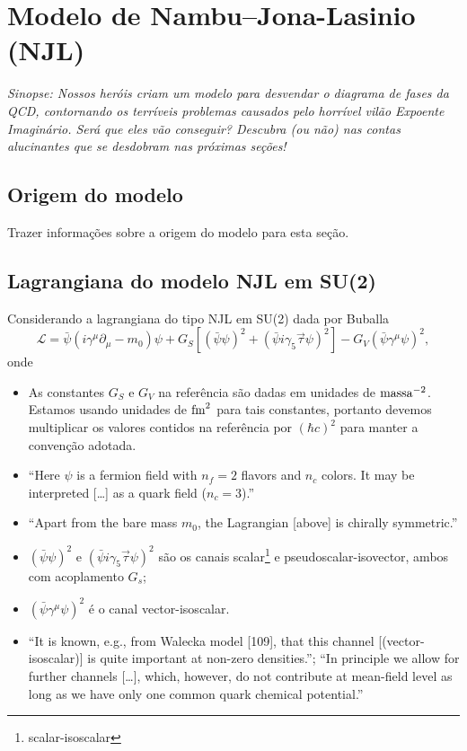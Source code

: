 \chapter{Modelo de Nambu--Jona-Lasinio (NJL)}

\begin{fullwidth}\it
Sinopse: Nossos heróis criam um modelo para desvendar o diagrama de fases da QCD, contornando os terríveis problemas causados pelo horrível vilão Expoente Imaginário. Será que eles vão conseguir? Descubra (ou não) nas contas alucinantes que se desdobram nas próximas seções!
\end{fullwidth}

\section{Origem do modelo}

Trazer informações sobre a origem do modelo para esta seção.

\section{Lagrangiana do modelo NJL em SU(2)}

Considerando a lagrangiana do tipo NJL em SU(2) dada por Buballa\cite{Buballa1996}
\begin{equation}
	\mathcal{L} = \bar{\psi}(i\gamma^\mu\partial_\mu - m_0)\psi + G_S[(\bar{\psi}\psi)^2 + (\bar{\psi}i\gamma_5\vec{\tau}\psi)^2] - G_V(\bar{\psi}\gamma^\mu \psi)^2,
\end{equation}
%
onde
\begin{itemize}
	\item As constantes $G_S$ e $G_V$ na referência são dadas em unidades de $\rm{massa}^{-2}$. Estamos usando unidades de $\rm{fm}^2$ para tais constantes, portanto devemos multiplicar os valores contidos na referência por $(\hbar c)^2$ para manter a convenção adotada.
	\item ``Here $\psi$ is a fermion field with $n_f = 2$ flavors and $n_c$ colors. It may be interpreted [\dots] as a quark field ($n_c = 3$).''
	\item ``Apart from the bare mass $m_0$, the Lagrangian [above] is chirally symmetric.''
	\item $(\bar{\psi}\psi)^2$ e $(\bar{\psi}i\gamma_5\vec{\tau}\psi)^2$ são os canais scalar\footnote{scalar-isoscalar} e pseudoscalar-isovector, ambos com acoplamento $G_s$;
	\item $(\bar{\psi}\gamma^\mu \psi)^2$ é o canal vector-isoscalar. 
	\item ``It is known, e.g., from Walecka model [109], that this channel [(vector-isoscalar)] is quite important at non-zero densities.''; ``In principle we allow for further channels [\dots], which, however, do not contribute at mean-field level as long as we have only one common quark chemical potential.''\cite{Buballa}
\end{itemize}

